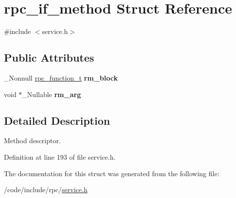 \hypertarget{structrpc__if__method}{}\section{rpc\+\_\+if\+\_\+method Struct Reference}
\label{structrpc__if__method}


{\ttfamily \#include $<$service.\+h$>$}

\subsection*{Public Attributes}
\begin{DoxyCompactItemize}
\item 
\+\_\+\+Nonnull \hyperlink{service_8h_ae49a22468cfcd4adfa558078e9e4e312}{rpc\+\_\+function\+\_\+t} {\bfseries rm\+\_\+block}\hypertarget{structrpc__if__method_a5db192112740ed1adb36f74ff7c92a80}{}\label{structrpc__if__method_a5db192112740ed1adb36f74ff7c92a80}

\item 
void $\ast$\+\_\+\+Nullable {\bfseries rm\+\_\+arg}\hypertarget{structrpc__if__method_a85a2f339a726ef4afb885cbf157c0998}{}\label{structrpc__if__method_a85a2f339a726ef4afb885cbf157c0998}

\end{DoxyCompactItemize}


\subsection{Detailed Description}
Method descriptor. 

Definition at line 193 of file service.\+h.



The documentation for this struct was generated from the following file\+:\begin{DoxyCompactItemize}
\item 
/code/include/rpc/\hyperlink{service_8h}{service.\+h}\end{DoxyCompactItemize}
